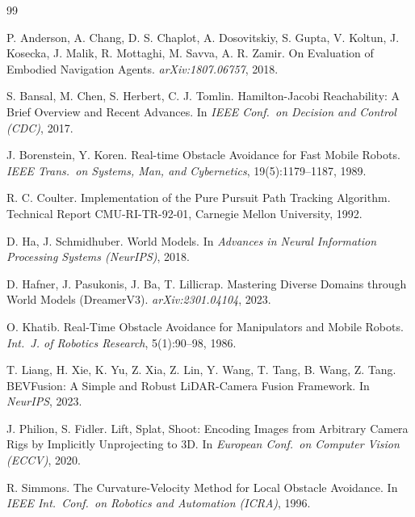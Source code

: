 \documentclass[11pt,a4paper]{article}
\begin{document}
\begin{thebibliography}{99}

P. Anderson, A. Chang, D. S. Chaplot, A. Dosovitskiy, S. Gupta, V. Koltun, J. Kosecka, J. Malik, R. Mottaghi, M. Savva, A. R. Zamir.
\newblock On Evaluation of Embodied Navigation Agents.
\newblock \emph{arXiv:1807.06757}, 2018.

S. Bansal, M. Chen, S. Herbert, C. J. Tomlin.
\newblock Hamilton-Jacobi Reachability: A Brief Overview and Recent Advances.
\newblock In \emph{IEEE Conf.\ on Decision and Control (CDC)}, 2017.

J. Borenstein, Y. Koren.
\newblock Real-time Obstacle Avoidance for Fast Mobile Robots.
\newblock \emph{IEEE Trans.\ on Systems, Man, and Cybernetics}, 19(5):1179--1187, 1989.

R. C. Coulter.
\newblock Implementation of the Pure Pursuit Path Tracking Algorithm.
\newblock Technical Report CMU-RI-TR-92-01, Carnegie Mellon University, 1992.

D. Ha, J. Schmidhuber.
\newblock World Models.
\newblock In \emph{Advances in Neural Information Processing Systems (NeurIPS)}, 2018.

D. Hafner, J. Pasukonis, J. Ba, T. Lillicrap.
\newblock Mastering Diverse Domains through World Models (DreamerV3).
\newblock \emph{arXiv:2301.04104}, 2023.

O. Khatib.
\newblock Real-Time Obstacle Avoidance for Manipulators and Mobile Robots.
\newblock \emph{Int.\ J. of Robotics Research}, 5(1):90--98, 1986.

T. Liang, H. Xie, K. Yu, Z. Xia, Z. Lin, Y. Wang, T. Tang, B. Wang, Z. Tang.
\newblock BEVFusion: A Simple and Robust LiDAR-Camera Fusion Framework.
\newblock In \emph{NeurIPS}, 2023.

J. Philion, S. Fidler.
\newblock Lift, Splat, Shoot: Encoding Images from Arbitrary Camera Rigs by Implicitly Unprojecting to 3D.
\newblock In \emph{European Conf.\ on Computer Vision (ECCV)}, 2020.

R. Simmons.
\newblock The Curvature-Velocity Method for Local Obstacle Avoidance.
\newblock In \emph{IEEE Int.\ Conf.\ on Robotics and Automation (ICRA)}, 1996.


\end{thebibliography}
\end{document}
